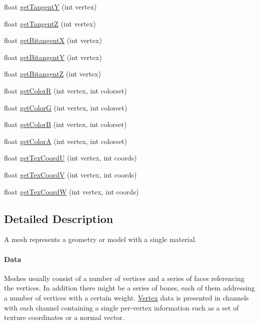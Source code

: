 \begin{DoxyCompactItemize}
\item 
float \hyperlink{classjassimp_1_1_ai_mesh_a3e24a35c0fed180e3d487f54f1b483bf}{get\+Tangent\+Y} (int vertex)
\item 
float \hyperlink{classjassimp_1_1_ai_mesh_a1d8ae20230cbcb2c8790b45971c0b271}{get\+Tangent\+Z} (int vertex)
\item 
float \hyperlink{classjassimp_1_1_ai_mesh_ab4a4a57615a7cff93e4f5dd6a1118791}{get\+Bitangent\+X} (int vertex)
\item 
float \hyperlink{classjassimp_1_1_ai_mesh_ace7875fb40281b0723187f0f2c1b69c1}{get\+Bitangent\+Y} (int vertex)
\item 
float \hyperlink{classjassimp_1_1_ai_mesh_a53c35af707b8bf32a5043f2ed70806eb}{get\+Bitangent\+Z} (int vertex)
\item 
float \hyperlink{classjassimp_1_1_ai_mesh_ac855813c83fd4472604c2fdc7f516a18}{get\+Color\+R} (int vertex, int colorset)
\item 
float \hyperlink{classjassimp_1_1_ai_mesh_ae094bfb42587ed03aa80199c4e520720}{get\+Color\+G} (int vertex, int colorset)
\item 
float \hyperlink{classjassimp_1_1_ai_mesh_a51ea034317f0b667c1e6ba8609c7322e}{get\+Color\+B} (int vertex, int colorset)
\item 
float \hyperlink{classjassimp_1_1_ai_mesh_ae5e5ac85167a97e1c2b312e1fe3ce665}{get\+Color\+A} (int vertex, int colorset)
\item 
float \hyperlink{classjassimp_1_1_ai_mesh_a74029d45d4c48786ba5e770f5713e48e}{get\+Tex\+Coord\+U} (int vertex, int coords)
\item 
float \hyperlink{classjassimp_1_1_ai_mesh_a957a27c6b7dfcd62f3f025b65d94c2af}{get\+Tex\+Coord\+V} (int vertex, int coords)
\item 
float \hyperlink{classjassimp_1_1_ai_mesh_a79a7ae306edd412ec429cc837f8b48fd}{get\+Tex\+Coord\+W} (int vertex, int coords)
\end{DoxyCompactItemize}


\subsection{Detailed Description}
A mesh represents a geometry or model with a single material. 

\paragraph*{Data}

Meshes usually consist of a number of vertices and a series of faces referencing the vertices. In addition there might be a series of bones, each of them addressing a number of vertices with a certain weight. \hyperlink{struct_vertex}{Vertex} data is presented in channels with each channel containing a single per-\/vertex information such as a set of texture coordinates or a normal vector.

